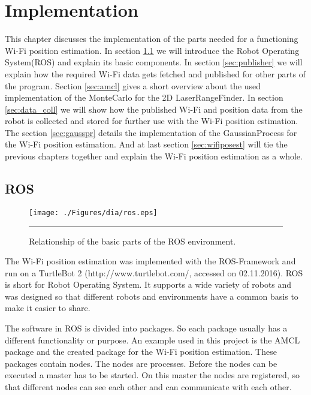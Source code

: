 \chapter{Implementation} %
\label{Chapter3}
This chapter discusses the implementation of the parts needed for a functioning Wi-Fi position estimation. In section \ref{sec:ros} we will introduce the Robot Operating System(ROS) and explain its basic components.
In section \ref{sec:publisher} we will explain how the required Wi-Fi data gets fetched and published for other parts of the program.
Section \ref{sec:amcl} gives a short overview about the used implementation of the \Gls{MonteCarlo} for the 2D \gls{LaserRangeFinder}.
In section \ref{sec:data_coll} we will show how the published Wi-Fi and position data from the robot is collected and stored for further use with the Wi-Fi position estimation.
The section \ref{sec:gausspr} details the implementation of the \Gls{GaussianProcess} for the Wi-Fi position estimation.
And at last section \ref{sec:wifiposest} will tie the previous chapters together and explain the Wi-Fi position estimation as a whole.

\section{ROS}\label{sec:ros}
\begin{figure}[htbp]
	\centering
		\texttt{[image: ./Figures/dia/ros.eps]}
		\rule{35em}{0.5pt}
	\caption[Diagram of basic concepts in ROS]{Relationship of the basic parts of the ROS environment.}
	\label{fig:ros_architecture}
\end{figure}
The Wi-Fi position estimation was implemented with the ROS-Framework and run on a TurtleBot 2 (http://www.turtlebot.com/, accessed on 02.11.2016). ROS \citep{Fernandez:2015:LRR:2876174} \citep{288} is short for Robot Operating System. It supports a wide variety of robots and was designed so that different robots and environments have a common basis to make it easier to share. 

The software in ROS is divided into packages. So each package usually has a different functionality or purpose. An example used in this project is the AMCL package and the created package for the Wi-Fi position estimation. These packages contain nodes. The nodes are processes. Before the nodes can be executed a master has to be started. On this master the nodes are registered, so that different nodes can see each other and can communicate with each other. 

